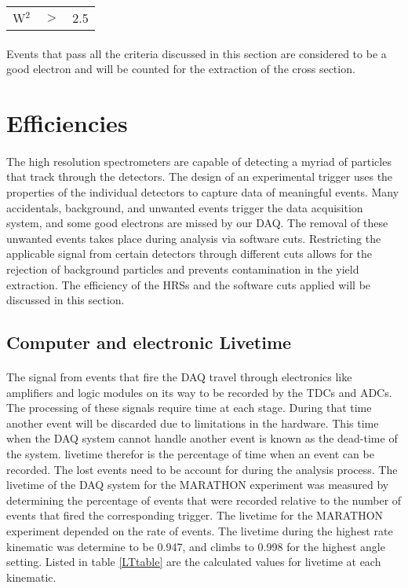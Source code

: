 \begin{tabular}{@{$\bullet$ }lll}
	W$^2$ &$>$ &2.5\\
\end{tabular}

\paragraph{}Events that pass all the criteria discussed in this section are considered to be a good electron and will be counted for the extraction of the cross section. 

\section{Efficiencies}\label{effs}
\paragraph{}The high resolution spectrometers are capable of detecting a myriad of particles that track through the detectors. The design of an experimental trigger uses the properties of the individual detectors to capture data of meaningful events. Many accidentals, background, and unwanted events trigger the data acquisition system, and some good electrons are missed by our DAQ. The removal of these unwanted events takes place during analysis via software cuts. Restricting the applicable signal from certain detectors through different cuts allows for the rejection of background particles and prevents contamination in the yield extraction. The efficiency of the HRSs and the software cuts applied will be discussed in this section.  

\subsection{Computer and electronic Livetime}
\paragraph{}The signal from events that fire the DAQ travel through electronics like amplifiers and logic modules on its way to be recorded by the TDCs and ADCs. The processing of these signals require time at each stage. During that time another event will be discarded due to limitations in the hardware. This time when the DAQ system cannot handle another event is known as the dead-time of the system. livetime therefor is the percentage of time when an event can be recorded. The lost events need to be account for during the analysis process. The livetime of the DAQ system for the MARATHON experiment was measured by determining the percentage of events that were recorded relative to the number of events that fired the corresponding trigger. The livetime for the MARATHON experiment depended on the rate of events. The livetime during the highest rate kinematic was determine to be 0.947, and climbs to 0.998 for the highest angle setting. Listed in table \ref{LTtable} are the calculated values for livetime at each kinematic. 

